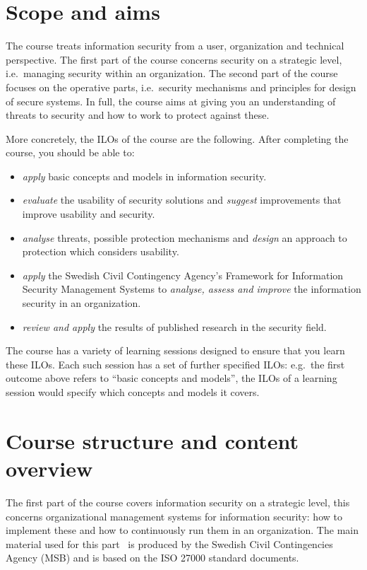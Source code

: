 \section{Scope and aims}
\label{sec:aim}
The course treats information security from a user, organization and technical 
perspective.
The first part of the course concerns security on a strategic level, i.e.\ 
managing security within an organization.
The second part of the course focuses on the operative parts, i.e.\ security 
mechanisms and principles for design of secure systems.
In full, the course aims at giving you an understanding of threats to security 
and how to work to protect against these.

More concretely, the \acp{ILO} of the course are the following.
After completing the course, you should be able to:
\begin{itemize}
  \item \emph{apply} basic concepts and models in information security.
  \item \emph{evaluate} the usability of security solutions and \emph{suggest} 
    improvements that improve usability and security.
  \item \emph{analyse} threats, possible protection mechanisms and 
    \emph{design} an approach to protection which considers usability.
  \item \emph{apply} the Swedish Civil Contingency Agency's Framework for 
    Information Security Management Systems to \emph{analyse, assess and 
      improve} the information security in an organization.
  \item \emph{review and apply} the results of published research in the 
    security field.
\end{itemize}
The course has a variety of learning sessions designed to ensure that you learn 
these \acp{ILO}.
Each such session has a set of further specified \acp{ILO}:
e.g.\ the first outcome above refers to \enquote{basic concepts and models}, 
the \acp{ILO} of a learning session would specify which concepts and models it 
covers.


\section{Course structure and content overview}
\label{sec:outline}

The first part of the course covers information security on a strategic level, 
this concerns organizational management systems for information security: how 
to implement these and how to continuously run them in an organization.
The main material used for this part~\cite{%
  MSB2011itm,MSB2011sle,MSB2011p,%
	MSB2011v,MSB2011r,MSB2011gap,MSB2011gb,%
	MSB2011vs,MSB2011us,MSB2011upo,%
	MSB2011pg,MSB2011koa,MSB2011i,%
	MSB2011o,MSB2011g,MSB2011lg,%
	MSB2011ulo,MSB2011kf,MSB2011fa%
} is produced by the Swedish Civil Contingencies Agency (MSB) and is based on 
the ISO 27000 standard documents.

